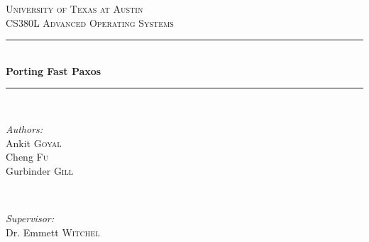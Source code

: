 \begin{titlepage}

\newcommand{\HRule}{\rule{\linewidth}{0.5mm}} %

\center %
 

\textsc{\LARGE University of Texas at Austin}\\[1.5cm] %
\textsc{\large CS380L Advanced Operating Systems}\\[0.5cm] %


\HRule \\[0.4cm]
{ \huge \bfseries Porting Fast Paxos}\\[0.4cm] %
\HRule \\[1.5cm]
 

\begin{minipage}{0.4\textwidth}
\begin{flushleft} \large
\emph{Authors:}\\
Ankit \textsc{Goyal} \\
Cheng \textsc{Fu} \\
Gurbinder \textsc{Gill}
\end{flushleft}
\end{minipage}
~
\begin{minipage}{0.4\textwidth}
\begin{flushright} \large
\emph{Supervisor:} \\
Dr. Emmett \textsc{Witchel} %
\end{flushright}
\end{minipage}\\[2cm]


\end{titlepage}
